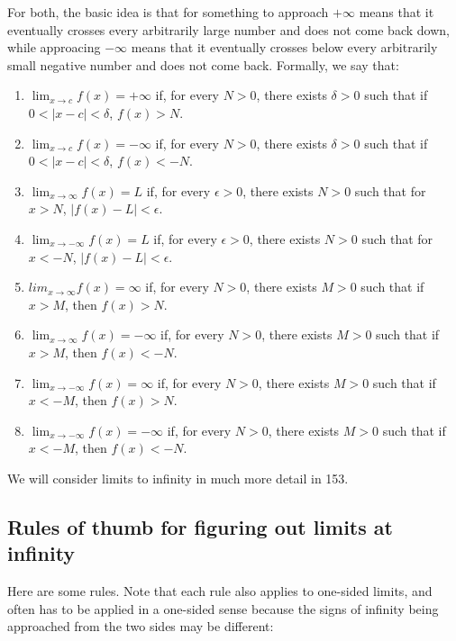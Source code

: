 \documentclass{amsart}
\begin{document}
For both, the basic idea is that for something to approach $+\infty$
means that it eventually crosses every arbitrarily large number and
does not come back down, while approacing $-\infty$ means that it
eventually crosses below every arbitrarily small negative number and
does not come back. Formally, we say that:

\begin{enumerate}
\item $\lim_{x \to c} f(x) = +\infty$ if, for every $N > 0$, there
  exists $\delta > 0$ such that if $0 < |x - c| < \delta$, $f(x) > N$.
\item $\lim_{x \to c} f(x) = -\infty$ if, for every $N > 0$, there
  exists $\delta > 0$ such that if $0 < |x - c| < \delta$, $f(x) < -N$.
\item $\lim_{x \to \infty} f(x) = L$ if, for every $\epsilon > 0$,
  there exists $N > 0$ such that for $x > N$, $|f(x) - L| < \epsilon$.
\item $\lim_{x \to -\infty} f(x) = L$ if, for every $\epsilon > 0$,
  there exists $N > 0$ such that for $x < -N$, $|f(x) - L| < \epsilon$.
\item $lim_{x \to \infty} f(x) = \infty$ if, for every $N > 0$, there
  exists $M > 0$ such that if $x > M$, then $f(x) > N$.
\item $\lim_{x \to \infty} f(x) = -\infty$ if, for every $N > 0$,
  there exists $M > 0$ such that if $x > M$, then $f(x) < - N$.
\item $\lim_{x \to -\infty} f(x) = \infty$ if, for every $N > 0$,
  there exists $M > 0$ such that if $x < -M$, then $f(x) > N$.
\item $\lim_{x \to -\infty} f(x) = -\infty$ if, for every $N > 0$,
  there exists $M > 0$ such that if $x < -M$, then $f(x) < -N$.
\end{enumerate}

We will consider limits to infinity in much more detail in 153.

\subsection{Rules of thumb for figuring out limits at infinity}

Here are some rules. Note that each rule also applies to one-sided
limits, and often has to be applied in a one-sided sense because the
signs of infinity being approached from the two sides may be
different:
\end{document}
